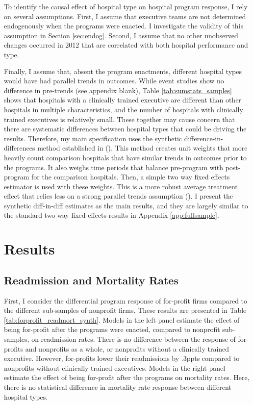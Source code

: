 \documentclass[12pt]{article}
\begin{document}
    To identify the causal effect of hospital type on hospital program response, I rely on several assumptions. First, I assume that executive teams are not determined endogenously when the programs were enacted. I investigate the validity of this assumption in Section \ref{sec:endog}. Second, I assume that no other unobserved changes occurred in 2012 that are correlated with both hospital performance and type. 
    
    Finally, I assume that, absent the program enactments, different hospital types would have had parallel trends in outcomes. While event studies show no difference in pre-trends (see appendix blank), Table \ref{tab:sumstats_samples} shows that hospitals with a clinically trained executive are different than other hospitals in multiple characteristics, and the number of hospitals with clinically trained executives is relatively small. These together may cause concern that there are systematic differences between hospital types that could be driving the results. Therefore, my main specification uses the synthetic difference-in-differences method established in \citeauthor{arkhangelsky2021synthetic} (\citeyear{arkhangelsky2021synthetic}). This method creates unit weights that more heavily count comparison hospitals that have similar trends in outcomes prior to the programs. It also weighs time periods that balance pre-program with post-program for the comparison hospitals. Then, a simple two way fixed effects estimator is used with these weights. This is a more robust average treatment effect that relies less on a strong parallel trends assumption (\cite{arkhangelsky2021synthetic}). I present the synthetic diff-in-diff estimates as the main results, and they are largely similar to the standard two way fixed effects results in Appendix \ref{app:fullsample}.

    
    
    \section{Results}

     
     \subsection{Readmission and Mortality Rates}

     First, I consider the differential program response of for-profit firms compared to the different sub-samples of nonprofit firms. These results are presented in Table \ref{tab:forprofit_readmort_synth}. Models in the left panel estimate the effect of being for-profit after the programs were enacted, compared to nonprofit sub-samples, on readmission rates. There is no difference between the response of for-profits and nonprofits as a whole, or nonprofits without a clinically trained executive. However, for-profits lower their readmissions by .3ppts compared to nonprofits without clinically trained executives. Models in the right panel estimate the effect of being for-profit after the programs on mortality rates. Here, there is no statistical difference in mortality rate response between different hospital types. 
\end{document}
